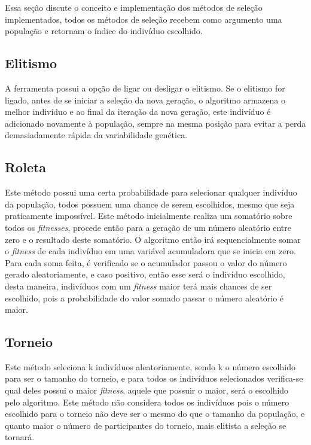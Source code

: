 \documentclass[12pt]{article}
\begin{document}
Essa seção discute o conceito e implementação dos métodos de seleção implementados, todos os métodos de seleção recebem como argumento uma população e 
retornam o índice do indivíduo escolhido.

\subsection{Elitismo}

A ferramenta possui a opção de ligar ou desligar o elitismo. Se o elitismo for ligado, antes de se iniciar a seleção da nova geração, 
o algoritmo armazena o melhor indivíduo e ao final da iteração da nova geração, este indivíduo é adicionado novamente à população, sempre 
na mesma posição para evitar a perda demasiadamente rápida da variabilidade genética.

\subsection{Roleta}

Este método possui uma certa probabilidade para selecionar qualquer indivíduo da população, todos possuem uma chance de serem escolhidos, 
mesmo que seja praticamente impossível. Este método inicialmente realiza um somatório sobre todos os \textit{fitnesses}, procede então para a 
geração de um número aleatório entre zero e o resultado deste somatório. O algoritmo então irá sequencialmente somar o \textit{fitness} de cada 
indivíduo em uma variável acumuladora que se inicia em zero. Para cada soma feita, é verificado se o acumulador passou o valor do número gerado 
aleatoriamente, e caso positivo, então esse será o indivíduo escolhido, desta maneira, indivíduos com um \textit{fitness} maior terá mais chances 
de ser escolhido, pois a probabilidade do valor somado passar o número aleatório é maior.

\subsection{Torneio}

Este método seleciona k indivíduos aleatoriamente, sendo k o número escolhido para ser o tamanho do torneio, e para todos os indivíduos selecionados 
verifica-se qual deles possui o maior \textit{fitness}, aquele que possuir o maior, será o escolhido pelo algoritmo. Este método não considera todos os 
indivíduos pois o número escolhido para o torneio não deve ser o mesmo do que o tamanho da população, e quanto maior o número de participantes do torneio, 
mais elitista a seleção se tornará.
\end{document}
